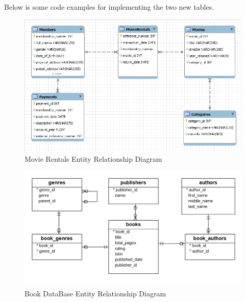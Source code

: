\documentclass[a4paper,12pt]{article}
\begin{document}
Below is some code examples for implementing the two new tables.\\
















 
 
 
 
 
\newpage

\begin{figure}[!h]
	\centering
	\includegraphics[width=16cm]{myflix_erd.png}
	\caption*{Movie Rentals Entity Relationship Diagram}
\end{figure}

\begin{figure}[!h]
	\centering
	\includegraphics[width=16cm]{book_plan.png}
	\caption*{Book DataBase Entity Relationship Diagram}
\end{figure}
\end{document}

